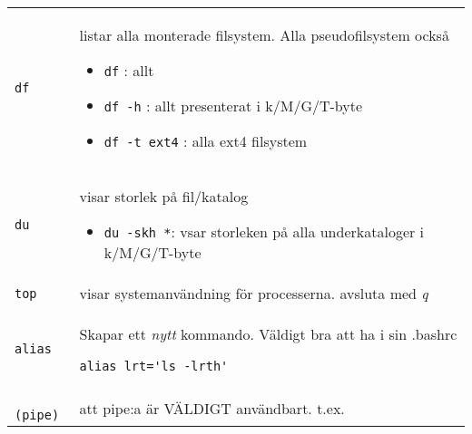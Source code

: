 \documentclass[a4paper]{article}
\begin{document}
\begin{longtable}{l|l}
\begin{minipage}[t]{0.8\textwidth}
  \end{minipage}
  \\
  \midrule
  \begin{minipage}[t]{0.2\textwidth} 
    \texttt{df}
  \end{minipage}
  &
  \begin{minipage}[t]{0.8\textwidth} 
listar alla monterade filsystem. Alla pseudofilsystem ocks{\aa}

\begin{itemize}

\item
  \texttt{df} : allt
\item
  \texttt{df -h} : allt presenterat i k/M/G/T-byte
\item
  \texttt{df -t ext4} : alla ext4 filsystem
\end{itemize}

  \end{minipage}
  \\
  \midrule
  \begin{minipage}[t]{0.2\textwidth} 
    \texttt{du}
  \end{minipage}
  &
  \begin{minipage}[t]{0.8\textwidth} 
visar storlek p{\aa} fil/katalog

\begin{itemize}

\item
  \texttt{du -skh *}: vsar storleken p{\aa} alla underkataloger i k/M/G/T-byte
\end{itemize}

  \end{minipage}
  \\
  \midrule
  \begin{minipage}[t]{0.2\textwidth} 
    \texttt{top}
  \end{minipage}
  &
  \begin{minipage}[t]{0.8\textwidth} 
visar systemanv\"andning f\"or processerna. avsluta med \emph{q}
  \end{minipage}
  \\
  \midrule
  \begin{minipage}[t]{0.2\textwidth} 
    \texttt{alias}
  \end{minipage}
  &
  \begin{minipage}[t]{0.8\textwidth} 
Skapar ett \emph{nytt} kommando. V\"aldigt bra att ha i sin .bashrc

\begin{verbatim}
alias lrt='ls -lrth'
\end{verbatim}
  \end{minipage}
  \\
  \midrule
  \begin{minipage}[t]{0.2\textwidth} 
    \texttt{\textbar{} (pipe)}
  \end{minipage}
  &
  \begin{minipage}[t]{0.8\textwidth} 
att pipe:a \"ar V\"ALDIGT anv\"andbart. t.ex.


\end{minipage}
\end{longtable}
\end{document}
